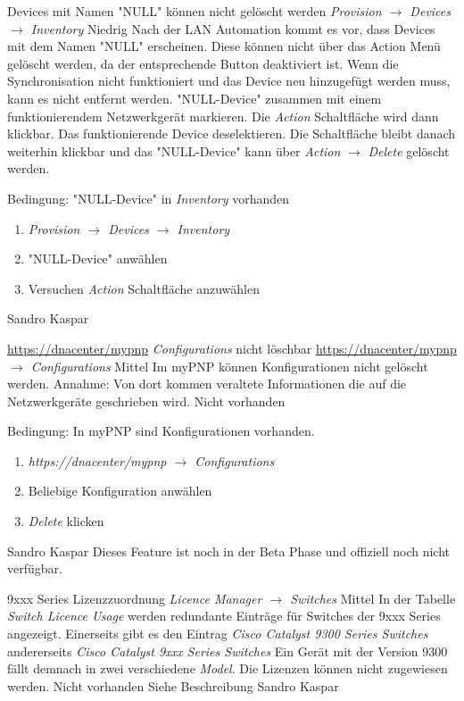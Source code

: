 \bugreport
{Devices mit Namen "NULL" können nicht gelöscht werden}
{\textit{Provision $\rightarrow$ Devices $\rightarrow$ Inventory}}
{Niedrig}
{Nach der LAN Automation kommt es vor, dass Devices mit dem Namen "NULL" erscheinen. Diese können nicht über das Action Menü gelöscht werden, da der entsprechende Button deaktiviert ist.}
{Wenn die Synchronisation nicht funktioniert und das Device neu hinzugefügt werden muss, kann es nicht entfernt werden.}
{"NULL-Device" zusammen mit einem funktionierendem Netzwerkgerät markieren. Die \textit{Action} Schaltfläche wird dann klickbar. Das funktionierende Device deselektieren. Die Schaltfläche bleibt danach weiterhin klickbar und das "NULL-Device" kann über \textit{Action} $\rightarrow$ \textit{Delete} gelöscht werden.}
{
	Bedingung: "NULL-Device" in \textit{Inventory} vorhanden
	\begin{enumerate}
		\item \textit{Provision $\rightarrow$ Devices $\rightarrow$ Inventory}
		\item "NULL-Device" anwählen
		\item Versuchen \textit{Action} Schaltfläche anzuwählen
	\end{enumerate}
}
{Sandro Kaspar}
{}

\bugreport
{\url{https://dnacenter/mypnp} \textit{Configurations} nicht löschbar}
{\url{https://dnacenter/mypnp} \textit{$\rightarrow$ Configurations}}
{Mittel}
{Im myPNP können Konfigurationen nicht gelöscht werden.}
{Annahme: Von dort kommen veraltete Informationen die auf die Netzwerkgeräte geschrieben wird.}
{Nicht vorhanden}
{
	Bedingung: In myPNP sind Konfigurationen vorhanden.
	\begin{enumerate}
		\item \textit{https://dnacenter/mypnp $\rightarrow$ Configurations}
		\item Beliebige Konfiguration anwählen
		\item \textit{Delete} klicken
	\end{enumerate}
}
{Sandro Kaspar}
{Dieses Feature ist noch in der Beta Phase und offiziell noch nicht verfügbar.}


\bugreport
{9xxx Series Lizenzzuordnung}
{\textit{Licence Manager $\rightarrow$ Switches}}
{Mittel}
{In der Tabelle \textit{Switch Licence Usage} werden redundante Einträge für Switches der 9xxx Series angezeigt. Einerseits gibt es den Eintrag \textit{Cisco Catalyst 9300 Series Switches} andererseits \textit{Cisco Catalyst 9xxx Series Switches} Ein Gerät mit der Version 9300 fällt demnach in zwei verschiedene \textit{Model}.}
{Die Lizenzen können nicht zugewiesen werden.}
{Nicht vorhanden}
{
Siehe Beschreibung
}
{Sandro Kaspar}
{}


